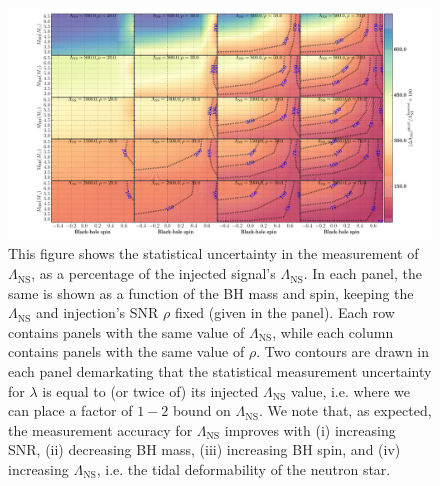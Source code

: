 \documentclass[aps,prd,amsmath,floats,floatfix, twocolumn,
superscriptaddress,nofootinbib,showpacs]{revtex4-1}
\newcommand{\lambdans}{\Lambda_\mathrm{NS}}
\begin{document}
\begin{figure}
\centering    
\includegraphics[trim={3cm 0 0 0},width=2.3\columnwidth]{plots/TTLambdaCIWidths90_0_Lambda_SNR.pdf}
\caption{This figure shows the statistical uncertainty in the measurement of
$\lambdans$, as a percentage of the injected signal's $\lambdans$. In each panel, 
the same is shown as a function of the BH mass and spin, keeping the 
$\lambdans$ and injection's SNR $\rho$ fixed (given in the panel). Each row contains
panels with the same value of $\lambdans$, while each column contains panels 
with the same value of $\rho$. Two contours are drawn in each panel demarkating
that the statistical measurement uncertainty for $\lambda$ is equal to (or twice
of) its injected $\lambdans$ value, i.e. where we can place a factor of $1-2$ 
bound on $\lambdans$.
% 
We note that, as expected, the measurement accuracy for $\lambdans$ improves with (i) increasing
SNR, (ii) decreasing BH mass, (iii) increasing BH spin, and 
(iv) increasing $\lambdans$, i.e. the tidal deformability of the neutron star.
}
\label{fig:TT_LambdaCIWidths90_0_Lambda_SNR}
\end{figure}
% 
\end{document}
